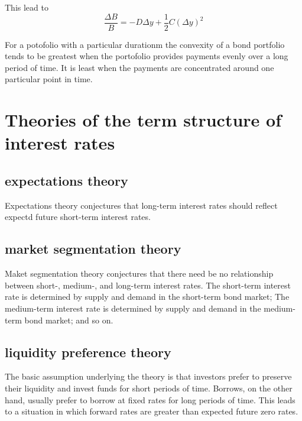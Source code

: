 \documentclass{article}
\begin{document}
This lead to
\[
\frac{\Delta B}{B}=-D\Delta y+\frac{1}{2}C(\Delta y)^2
\]

For a potofolio with a particular durationm the convexity of a bond portfolio tends to be greatest when the portofolio provides payments evenly over a long period of time. It is least when the payments are concentrated around one particular point in time.

\section{Theories of the term structure of interest rates}
\subsection{expectations theory}
Expectations theory conjectures that long-term interest rates should reflect expectd future short-term interest rates.

\subsection{market segmentation theory}
Maket segmentation theory conjectures that there need be no relationship between short-, medium-, and long-term interest rates. The short-term interest rate is determined by supply and demand in the short-term bond market; The medium-term interest rate is determined by supply and demand in the medium-term bond market; and so on.

\subsection{liquidity preference theory}
The basic assumption underlying the theory is that investors prefer to preserve their liquidity and invest funds for short periods of time. Borrows, on the other hand, usually prefer to borrow at fixed rates for long periods of time. This leads to a situation in which forward rates are greater than expected future zero rates.
\end{document}
